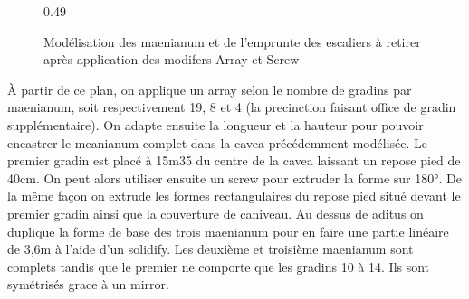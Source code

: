 \begin{figure}[!h]
\begin{subfigureth}{0.49\textwidth}
		\caption[Modélisation des \gls{maenianum}]{Modélisation des \gls{maenianum} et de l'emprunte des escaliers à retirer après application des modifers Array et Screw}
		\label{modelMaenianum} 		
	\end{subfigureth}	
\end{figure}

\`{A} partir de ce plan, on applique un \gls{array} selon le nombre de gradins par maenianum, soit respectivement 19, 8 et 4 (la precinction faisant office de gradin supplémentaire). On adapte ensuite la longueur et la hauteur pour pouvoir encastrer le meanianum complet dans la cavea précédemment modélisée. Le premier gradin est placé à 15m35 du centre de la cavea laissant un repose pied de 40cm. On peut alors utiliser ensuite un \gls{screw} pour extruder la forme sur 180°. De la même façon on extrude les formes rectangulaires du repose pied situé devant le premier gradin ainsi que la couverture de caniveau. Au dessus de aditus on duplique la forme de base des trois maenianum pour en faire une partie linéaire de 3,6m à l'aide d'un \gls{solidify}. Les deuxième et troisième maenianum sont complets tandis que le premier ne comporte que les gradins 10 à 14. Ils sont symétrisés grace à un \gls{mirror}.

